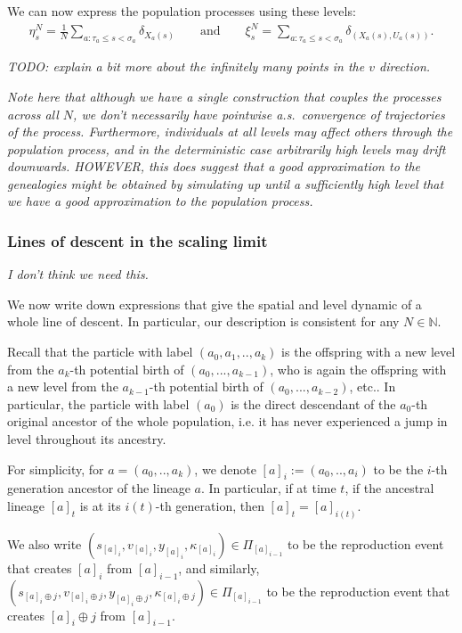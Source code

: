 \documentclass[12pt]{article}
\newcommand{\lp}{\xi}              %
\newcommand{\concat}{\oplus}   %
\newcommand{\comment}[1]{{\color{blue} \it #1}}
\begin{document}
We can now express the population processes using these levels:
\begin{align*}
    \eta^N_s = \frac{1}{N} \sum_{a : \tau_a \le s < \sigma_a} \delta_{X_a(s)}
    \qquad \text{and} \qquad
    \lp^N_s = \sum_{a : \tau_a \le s < \sigma_a} \delta_{(X_a(s), U_a(s))} .
\end{align*}

\comment{TODO: explain a bit more about the infinitely many points in the $v$ direction.}

\comment{
    Note here that although we have a single construction that couples
    the processes across all $N$,
    we don't necessarily have pointwise a.s.\ convergence of trajectories of the process.
    Furthermore, individuals at all levels may affect others through the population process,
    and in the deterministic case arbitrarily high levels may drift downwards.
    HOWEVER, this does suggest that a good approximation to the genealogies
    might be obtained by simulating up until a sufficiently high level
    that we have a good approximation to the population process.
}

\subsubsection{Lines of descent in the scaling limit}

\comment{I don't think we need this.}

We now write down expressions
that give the spatial and level dynamic
of a whole line of descent.
In particular, our description is consistent
for any $N \in \mathbb{N}$.

Recall that
the particle with label $(a_0,a_1,..,a_k)$
is the offspring
with a new level
from the $a_k$-th potential birth
of $(a_0,...,a_{k-1})$,
who is again the offspring
with a new level from
the $a_{k-1}$-th potential birth
of $(a_0,...,a_{k-2})$, 
etc..
In particular, 
the particle with label $(a_0)$
is the direct descendant of
the $a_0$-th original ancestor
of the whole population, i.e.
it has never experienced
a jump in level throughout
its ancestry.

For simplicity, for $a=(a_0,..,a_k)$,
we denote $[a]_{i}:=(a_0,..,a_i)$
to be the $i$-th generation 
ancestor of the lineage $a$.
In particular, if at time $t$,
if the ancestral lineage $[a]_t$
is at its $i(t)$-th generation,
then $[a]_t = [a]_{i(t)}$.

We also write 
$(s_{[a]_{i}}, v_{[a]_{i}}, y_{[a]_{i}}, \kappa_{[a]_{i}})
\in \Pi_{[a]_{i-1}}$
to be the reproduction event
that creates $[a]_{i}$ from $[a]_{i-1}$,
and similarly,
$(s_{[a]_{i} \concat j}, v_{[a]_{i} \concat j}, y_{[a]_{i} \concat j}, \kappa_{[a]_{i} \concat j})
\in \Pi_{[a]_{i-1}}$
to be the reproduction event 
that creates $[a]_{i} \concat j$
from $[a]_{i-1}$.
\end{document}
